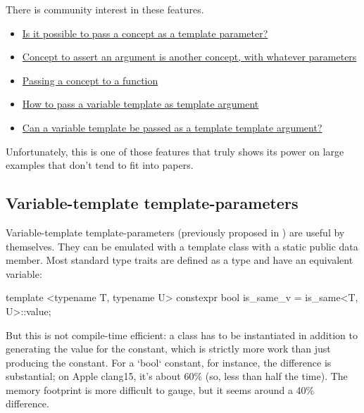 \documentclass{wg21}
\begin{document}
There is community interest in these features.
\begin{itemize}
\item \href{https://stackoverflow.com/questions/63098070/is-it-possible-to-pass-a-concept-as-a-template-parameter}{Is it possible to pass a concept as a template parameter?}
\item \href{https://stackoverflow.com/questions/72488554/concept-to-assert-an-argument-is-another-concept-with-whatever-parameters}{Concept to assert an argument is another concept, with whatever parameters}
\item \href{https://stackoverflow.com/questions/58875829/passing-a-concept-to-a-function}{Passing a concept to a function}
\item \href{https://stackoverflow.com/questions/61664468/how-to-pass-a-variable-template-as-template-argument}{How to pass a variable template as template argument}
\item \href{https://stackoverflow.com/questions/58592312/can-a-variable-template-be-passed-as-a-template-template-argument}{Can a variable template be passed as a template template argument?}
\end{itemize}

Unfortunately, this is one of those features that truly shows its power on large examples that don't tend to fit into papers.

\subsection{Variable-template template-parameters}

Variable-template template-parameters (previously proposed in ) are useful by themselves.
They can be emulated with a template class with a static public  data member.
Most standard type traits are defined as a type and have an equivalent  variable:

\begin{colorblock}
template <typename T, typename U>
constexpr bool is_same_v = is_same<T, U>::value;
\end{colorblock}

But this is not compile-time efficient: a class has to be instantiated in addition to generating the value for the constant, which is strictly more work than just producing the constant.
For a `bool` constant, for instance, the difference is substantial; on Apple clang15, it's about 60\% (so, less than half the time).
The memory footprint is more difficult to gauge, but it seems around a 40\% difference.
\end{document}
